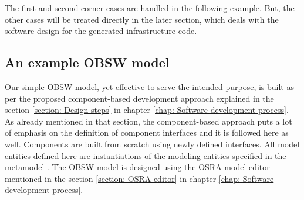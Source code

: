The first and second corner cases are handled in the following example. But, the other cases will be treated directly in the later section, which deals with the software design for the generated infrastructure code. 

\subsection{An example OBSW model}
Our simple OBSW model, yet effective to serve the intended purpose, is built as per the proposed component-based development approach explained in the section \cref{section: Design steps} in chapter \cref{chap: Software development process}. As already mentioned in that section, the component-based approach puts a lot of emphasis on the definition of component interfaces \cite{CompBasedProcess} and it is followed here as well. Components are built from scratch using newly defined interfaces. All model entities defined here are instantiations of the modeling entities specified in the metamodel \cite{SpecMetamodel}. The OBSW model is designed using the OSRA model editor mentioned in the section \cref{section: OSRA editor} in chapter \cref{chap: Software development process}.

